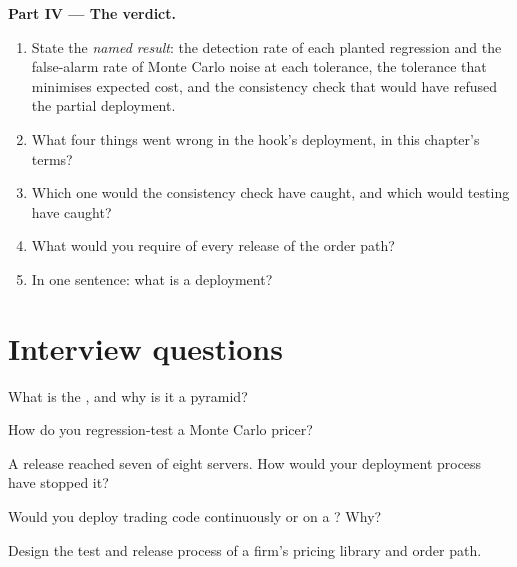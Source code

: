 \begin{problem}
\medskip\noindent\textbf{Part IV --- The verdict.}
\begin{enumerate}[resume]
\item State the \emph{named result}: the detection rate of each planted regression and the false-alarm rate of Monte Carlo noise at each
tolerance, the tolerance that minimises expected cost, and the consistency check that would have refused the partial deployment.
\item What four things went wrong in the hook's deployment, in this chapter's terms?
\item Which one would the consistency check have caught, and which would testing have caught?
\item What would you require of every release of the order path?
\item In one sentence: what is a deployment?
\end{enumerate}
\end{problem}

\section{Interview questions}

\begin{interviewq}\label{iq:pl:testing-and-continuous-delivery:1}
What is the , and why is it a pyramid?
\end{interviewq}

\begin{interviewq}\label{iq:pl:testing-and-continuous-delivery:2}
How do you regression-test a Monte Carlo pricer?
\end{interviewq}

\begin{interviewq}\label{iq:pl:testing-and-continuous-delivery:3}
A release reached seven of eight servers. How would your deployment process have stopped it?
\end{interviewq}

\begin{interviewq}\label{iq:pl:testing-and-continuous-delivery:4}
Would you deploy trading code continuously or on a ? Why?
\end{interviewq}

\begin{interviewq}\label{iq:pl:testing-and-continuous-delivery:5}
Design the test and release process of a firm's pricing library and order path.
\end{interviewq}
